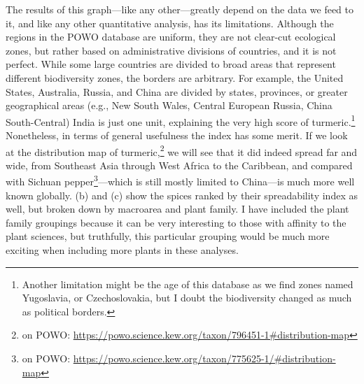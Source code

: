 The results of this graph---like any other---greatly depend on the data we feed to it, and like any other quantitative analysis, has its limitations. Although the regions in the \gls{POWO} database are uniform, they are not clear-cut ecological zones, but rather based on administrative divisions of countries, and it is not perfect. While some large countries are divided to broad areas that represent different biodiversity zones, the borders are arbitrary. For example, the United States, Australia, Russia, and China are divided by states, provinces, or greater geographical areas (e.g., New South Wales, Central European Russia, China South-Central) India is just one unit, explaining the very high score of turmeric.\footnote{Another limitation might be the age of this database as we find zones named Yugoslavia, or Czechoslovakia, but I doubt the biodiversity changed as much as political borders.} Nonetheless, in terms of general usefulness the index has some merit. If we look at the distribution map of turmeric,\footnote{ on \gls{POWO}: \url{https://powo.science.kew.org/taxon/796451-1\#distribution-map}} we will see that it did indeed spread far and wide, from Southeast Asia through West Africa to the Caribbean, and compared with Sichuan pepper\footnote{ on \gls{POWO}: \url{https://powo.science.kew.org/taxon/775625-1/\#distribution-map}}---which is still mostly limited to China---is much more well known globally.  (b) and (c) show the spices ranked by their spreadability index as well, but broken down by macroarea and plant family. I have included the plant family groupings because it can be very interesting to those with affinity to the plant sciences, but truthfully, this particular grouping would be much more exciting when including more plants in these analyses. 







